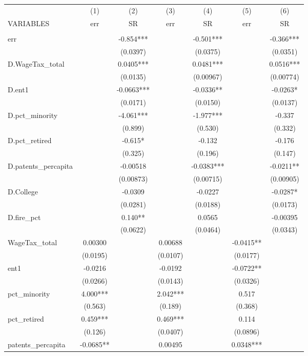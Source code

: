 \begin{tabular}{lcccccc} \hline
 & (1) & (2) & (3) & (4) & (5) & (6) \\
VARIABLES & err & SR & err & SR & err & SR \\ \hline
 &  &  &  &  &  &  \\
err &  & -0.854*** &  & -0.501*** &  & -0.366*** \\
 &  & (0.0397) &  & (0.0375) &  & (0.0351) \\
D.WageTax\_total &  & 0.0405*** &  & 0.0481*** &  & 0.0516*** \\
 &  & (0.0135) &  & (0.00967) &  & (0.00774) \\
D.ent1 &  & -0.0663*** &  & -0.0336** &  & -0.0263* \\
 &  & (0.0171) &  & (0.0150) &  & (0.0137) \\
D.pct\_minority &  & -4.061*** &  & -1.977*** &  & -0.337 \\
 &  & (0.899) &  & (0.530) &  & (0.332) \\
D.pct\_retired &  & -0.615* &  & -0.132 &  & -0.176 \\
 &  & (0.325) &  & (0.196) &  & (0.147) \\
D.patents\_percapita &  & -0.00518 &  & -0.0383*** &  & -0.0211** \\
 &  & (0.00873) &  & (0.00715) &  & (0.00905) \\
D.College &  & -0.0309 &  & -0.0227 &  & -0.0287* \\
 &  & (0.0281) &  & (0.0188) &  & (0.0173) \\
D.fire\_pct &  & 0.140** &  & 0.0565 &  & -0.00395 \\
 &  & (0.0622) &  & (0.0464) &  & (0.0343) \\
WageTax\_total & 0.00300 &  & 0.00688 &  & -0.0415** &  \\
 & (0.0195) &  & (0.0107) &  & (0.0177) &  \\
ent1 & -0.0216 &  & -0.0192 &  & -0.0722** &  \\
 & (0.0266) &  & (0.0143) &  & (0.0326) &  \\
pct\_minority & 4.000*** &  & 2.042*** &  & 0.517 &  \\
 & (0.563) &  & (0.189) &  & (0.368) &  \\
pct\_retired & 0.459*** &  & 0.469*** &  & 0.114 &  \\
 & (0.126) &  & (0.0407) &  & (0.0896) &  \\
patents\_percapita & -0.0685** &  & 0.00495 &  & 0.0348*** &  \\

\end{tabular}
